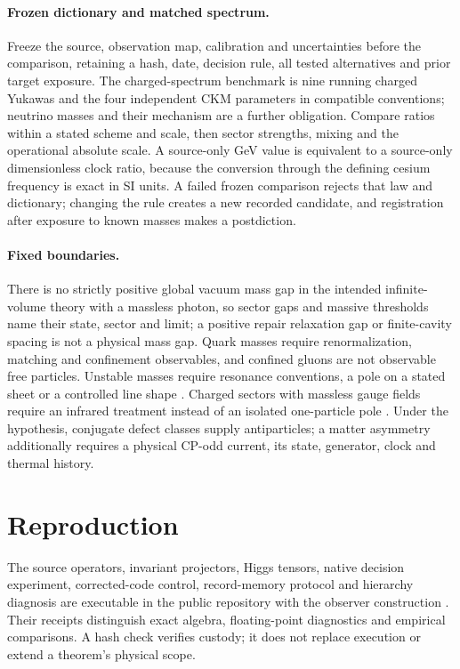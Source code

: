 \documentclass[11pt]{article}
\begin{document}
\paragraph{Frozen dictionary and matched spectrum.}
Freeze the source, observation map, calibration and uncertainties before the
comparison, retaining a hash, date, decision rule, all tested alternatives
and prior target exposure. The charged-spectrum benchmark is nine running
charged Yukawas and the four independent CKM parameters in compatible
conventions; neutrino masses and their mechanism are a further obligation.
Compare ratios within a stated scheme and scale, then sector strengths,
mixing and the operational absolute scale. A source-only GeV value is
equivalent to a source-only dimensionless clock ratio, because the
conversion through the defining cesium frequency is exact in SI units. A
failed frozen comparison rejects that law and dictionary; changing the rule
creates a new recorded candidate, and registration after exposure to known
masses makes a postdiction.

\paragraph{Fixed boundaries.}
There is no strictly positive global vacuum mass gap in the intended
infinite-volume theory with a massless photon, so sector gaps and massive
thresholds name their state, sector and limit; a positive repair relaxation
gap or finite-cavity spacing is not a physical mass gap. Quark masses
require renormalization, matching and confinement observables, and confined
gluons are not observable free particles. Unstable masses require resonance
conventions, a pole on a stated sheet or a controlled line shape
\cite{pdg2025resonances}. Charged sectors with massless gauge fields require
an infrared treatment instead of an isolated one-particle pole
\cite{buchholz1986,duch2023}. Under the hypothesis, conjugate defect classes
supply antiparticles; a matter asymmetry additionally requires a physical CP-odd current, its
state, generator, clock and thermal history.

\section*{Reproduction}

The source operators, invariant projectors, Higgs tensors, native decision
experiment, corrected-code control, record-memory protocol and hierarchy
diagnosis are executable in the public repository with the observer
construction \cite{ophmodel,ophrepo}. Their receipts distinguish exact
algebra, floating-point diagnostics and empirical comparisons. A hash check
verifies custody; it does not replace execution or extend a theorem's
physical scope.
\end{document}
